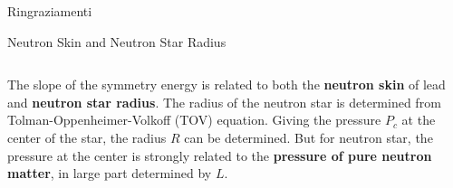 \documentclass[9pt,a4paper]{beamer}
\begin{document}
\begin{frame}[noframenumbering]{Ringraziamenti}
\begin{center}
\end{center}
\end{frame}

\begin{frame}[noframenumbering]
\begin{center}
\end{center}
\end{frame}

\begin{frame}[noframenumbering]{Neutron Skin and Neutron Star Radius}
\begin{columns}[T]
\begin{column}{.5\textwidth}
The slope of the symmetry energy is related to both the \textbf{neutron skin} of lead and \textbf{neutron star radius}. The radius of the neutron star is determined from Tolman-Oppenheimer-Volkoff (TOV) equation.
 Giving the pressure $P_{c}$ at the center of the star, the radius $R$ can be determined. But for neutron star, the pressure at the center is strongly related to the \textbf{pressure of pure neutron matter}, in large part determined by $L$.
 

\end{column}
\end{columns}
\end{frame}
\end{document}

